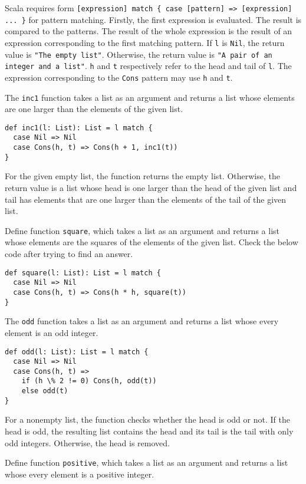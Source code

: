 Scala requires form \verb![expression] match { case [pattern] => [expression] ... }!
for pattern matching. Firstly, the first expression is evaluated. The result
is compared to the patterns. The result of the whole expression is the result of
an expression corresponding to the first matching pattern. If \verb!l! is
\verb!Nil!, the return value is \verb!"The empty list"!. Otherwise, the return
value is \verb!"A pair of an integer and a list"!. \verb!h! and \verb!t!
respectively refer to the head and tail of \verb!l!. The expression corresponding
to the \verb!Cons! pattern may use \verb!h! and \verb!t!.

The \verb!inc1! function takes a list as an argument and returns a list whose
elements are one larger than the elements of the given list.

\begin{verbatim}
def inc1(l: List): List = l match {
  case Nil => Nil
  case Cons(h, t) => Cons(h + 1, inc1(t))
}
\end{verbatim}

For the given empty list, the function returns the empty list. Otherwise, the
return value is a list whose head is one larger than the head of the given list
and tail has elements that are one larger than the elements of the tail of the
given list.

Define function \verb!square!, which takes a list as an argument and returns a
list whose elements are the squares of the elements of the given list. Check the
below code after trying to find an answer.

\begin{verbatim}
def square(l: List): List = l match {
  case Nil => Nil
  case Cons(h, t) => Cons(h * h, square(t))
}
\end{verbatim}

The \verb!odd! function takes a list as an argument and returns a list whose
every element is an odd integer.

\begin{verbatim}
def odd(l: List): List = l match {
  case Nil => Nil
  case Cons(h, t) =>
    if (h \% 2 != 0) Cons(h, odd(t))
    else odd(t)
}
\end{verbatim}

For a nonempty list, the function checks whether the head is odd or not. If the
head is odd, the resulting list contains the head and its tail is the tail with
only odd integers. Otherwise, the head is removed.

Define function \verb!positive!, which takes a list as an argument and returns a
list whose every element is a positive integer.

